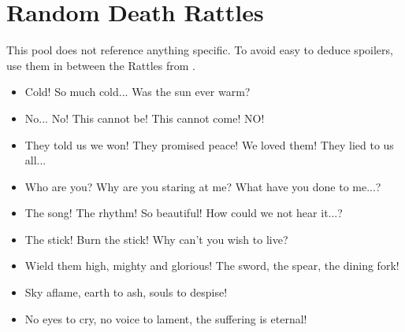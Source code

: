 \newpage
\section{Random Death Rattles}

This pool does not reference anything specific. To avoid easy to deduce spoilers, use them in between the Rattles from .


\begin{itemize}
	\item Cold! So much cold... Was the sun ever warm?
	
	\item No... No! This cannot be! This cannot come! NO!
	
	\item They told us we won! They promised peace! We loved them! They lied to us all...
	
	\item Who are you? Why are you staring at me? What have you done to me...?
	
	\item The song! The rhythm! So beautiful! How could we not hear it...?
	
	\item The stick! Burn the stick! Why can't you wish to live?
	
	\item Wield them high, mighty and glorious! The sword, the spear, the dining fork!
	
	\item Sky aflame, earth to ash, souls to despise!
	
	\item No eyes to cry, no voice to lament, the suffering is eternal!
\end{itemize}